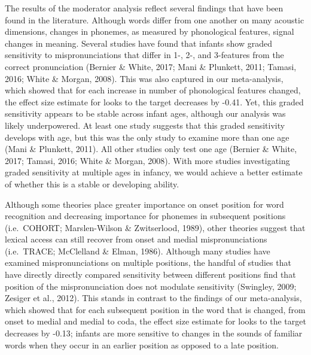 \documentclass[man]{apa6}
\begin{document}
The results of the moderator analysis reflect several findings that have been found in the literature. Although words differ from one another on many acoustic dimensions, changes in phonemes, as measured by phonological features, signal changes in meaning. Several studies have found that infants show graded sensitivity to mispronunciations that differ in 1-, 2-, and 3-features from the correct pronunciation (Bernier \& White, 2017; Mani \& Plunkett, 2011; Tamasi, 2016; White \& Morgan, 2008). This was also captured in our meta-analysis, which showed that for each increase in number of phonological features changed, the effect size estimate for looks to the target decreases by -0.41. Yet, this graded sensitivity appears to be stable across infant ages, although our analysis was likely underpowered. At least one study suggests that this graded sensitivity develops with age, but this was the only study to examine more than one age (Mani \& Plunkett, 2011). All other studies only test one age (Bernier \& White, 2017; Tamasi, 2016; White \& Morgan, 2008). With more studies investigating graded sensitivity at multiple ages in infancy, we would achieve a better estimate of whether this is a stable or developing ability.

Although some theories place greater importance on onset position for word recognition and decreasing importance for phonemes in subsequent positions (i.e.~COHORT; Marslen-Wilson \& Zwitserlood, 1989), other theories suggest that lexical access can still recover from onset and medial mispronunciations (i.e.~TRACE; McClelland \& Elman, 1986). Although many studies have examined mispronunciations on multiple positions, the handful of studies that have directly directly compared sensitivity between different positions find that position of the mispronunciation does not modulate sensitivity (Swingley, 2009; Zesiger et al., 2012). This stands in contrast to the findings of our meta-analysis, which showed that for each subsequent position in the word that is changed, from onset to medial and medial to coda, the effect size estimate for looks to the target decreases by -0.13; infants are more sensitive to changes in the sounds of familiar words when they occur in an earlier position as opposed to a late position.
\end{document}
